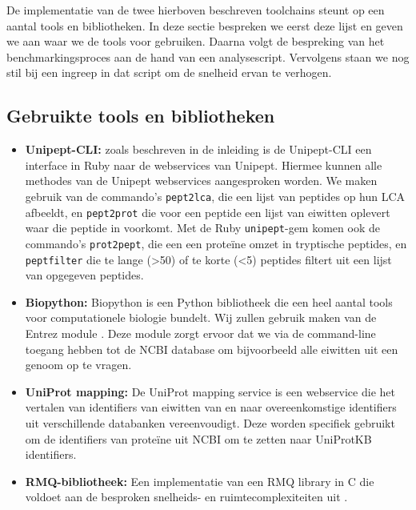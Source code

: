 De implementatie van de twee hierboven beschreven toolchains steunt op een 
aantal tools en bibliotheken. In deze sectie bespreken we eerst
deze lijst en geven we aan waar we de tools voor gebruiken. Daarna volgt de
bespreking van het benchmarkingsproces aan de hand van een analysescript.
Vervolgens staan we nog stil bij een ingreep in dat script om de snelheid ervan
te verhogen.

\subsection{Gebruikte tools en bibliotheken}

\begin{itemize}

\item \textbf{Unipept-CLI:} zoals beschreven in de inleiding is de Unipept-CLI
een interface in Ruby naar de webservices van Unipept. Hiermee kunnen alle
methodes van de Unipept webservices aangesproken worden. We maken gebruik van de
commando's \texttt{pept2lca}, die een lijst van peptides op hun LCA afbeeldt, en
\texttt{pept2prot} die voor een peptide een lijst van eiwitten oplevert waar
die peptide in voorkomt. Met de Ruby \texttt{unipept}-gem komen ook de
commando's \texttt{prot2pept}, die een een proteïne omzet in tryptische
peptides, en \texttt{peptfilter} die te lange (>50) of te korte (<5) peptides
filtert uit een lijst van opgegeven peptides.

\item \textbf{Biopython:} Biopython \cite{Biopy8:online} is een Python 
bibliotheek die een heel aantal tools voor computationele biologie bundelt. Wij 
zullen gebruik maken van de Entrez module \cite{Bio.E7:online}. Deze module 
zorgt ervoor dat we via de command-line toegang hebben tot de NCBI database om 
bijvoorbeeld alle eiwitten uit een genoom op te vragen.

\item \textbf{UniProt mapping:} De UniProt mapping \cite{Retri1:online} service
is een webservice die het vertalen van identifiers van eiwitten van en naar
overeenkomstige identifiers uit verschillende databanken vereenvoudigt. Deze
worden specifiek gebruikt om de identifiers van proteïne uit NCBI om te zetten
naar UniProtKB identifiers.

\item \textbf{RMQ-bibliotheek:} Een implementatie van een RMQ library
\cite{Hideo0:online, Hideo1:online} in C die voldoet aan de besproken snelheids-
en ruimtecomplexiteiten uit .


\end{itemize}
